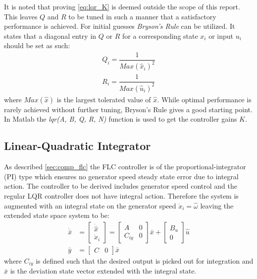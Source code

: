 It is noted that proving \cref{eq:lqr_K} is deemed outside the scope of this report. This leaves $ Q $ and $ R $ to be tuned in such a manner that a satisfactory performance is achieved. For initial guesses \textit{Bryson's Rule} can be utilized. It states that a diagonal entry in $ Q $ or $ R $ for a corresponding state $ x_i $ or input $ u_i $ should be set as such:
\begin{equation}\label{eq:bryson}
	\begin{split}
		Q_i = \dfrac{1}{Max(\hat x_i)^2} \\
		R_i = \dfrac{1}{Max(\hat u_i)^2}
	\end{split}
\end{equation}
where $ Max(\hat x) $ is the largest tolerated value of $ \hat x $. While optimal performance is rarely achieved without further tuning, Bryson's Rule gives a good starting point. In Matlab the \textit{lqr(A, B, Q, R, N)} function is used to get the controller gains $ K $.


\subsection{Linear-Quadratic Integrator} \label{sec:ctrl_lqi}
As described \cref{sec:comp_flc} the FLC controller is of the proportional-integrator (PI) type which ensures no generator speed steady state error due to integral action. The controller to be derived includes generator speed control and the regular LQR controller does not have integral action. Therefore the system is augmented with an integral state on the generator speed $ \dot x_i = \hat \omega $ leaving the extended state space system to be:
\begin{align} 
	\dot {\bar x} & = \begin{bmatrix} \dot{\hat x} \\ \dot x_i \end{bmatrix} = \begin{bmatrix} A &0 \\ C_{iy} & 0 \end{bmatrix} \bar x + \begin{bmatrix} B_u \\ 0 \end{bmatrix}  \hat u \\
	\bar y & = \begin{bmatrix} C & 0 \end{bmatrix} \bar x
\end{align}
where $ C_{iy} $ is defined such that the desired output is picked out for integration and $ \bar x $ is the deviation state vector extended with the integral state.

